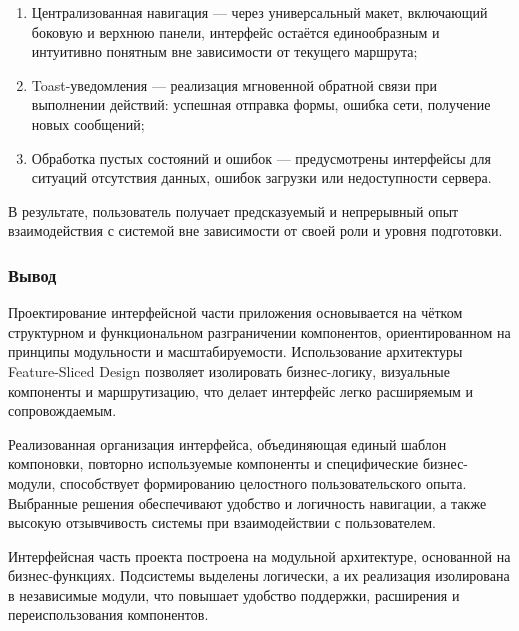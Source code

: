 \begin{enumerate}
  \item Централизованная навигация — через универсальный макет, включающий боковую и верхнюю панели, интерфейс остаётся единообразным и интуитивно понятным вне зависимости от текущего маршрута;
  \item Toast-уведомления — реализация мгновенной обратной связи при выполнении действий: успешная отправка формы, ошибка сети, получение новых сообщений;
  \item Обработка пустых состояний и ошибок — предусмотрены интерфейсы для ситуаций отсутствия данных, ошибок загрузки или недоступности сервера.
\end{enumerate}

В результате, пользователь получает предсказуемый и непрерывный опыт взаимодействия с системой вне зависимости от своей роли и уровня подготовки.

\subsubsection*{Вывод}

Проектирование интерфейсной части приложения основывается на чётком структурном и функциональном разграничении компонентов, ориентированном на принципы модульности и масштабируемости. Использование архитектуры Feature-Sliced Design позволяет изолировать бизнес-логику, визуальные компоненты и маршрутизацию, что делает интерфейс легко расширяемым и сопровождаемым.

Реализованная организация интерфейса, объединяющая единый шаблон компоновки, повторно используемые компоненты и специфические бизнес-модули, способствует формированию целостного пользовательского опыта. Выбранные решения обеспечивают удобство и логичность навигации, а также высокую отзывчивость системы при взаимодействии с пользователем.


Интерфейсная часть проекта построена на модульной архитектуре, основанной на бизнес-функциях. Подсистемы выделены логически, а их реализация изолирована в независимые модули, что повышает удобство поддержки, расширения и переиспользования компонентов.